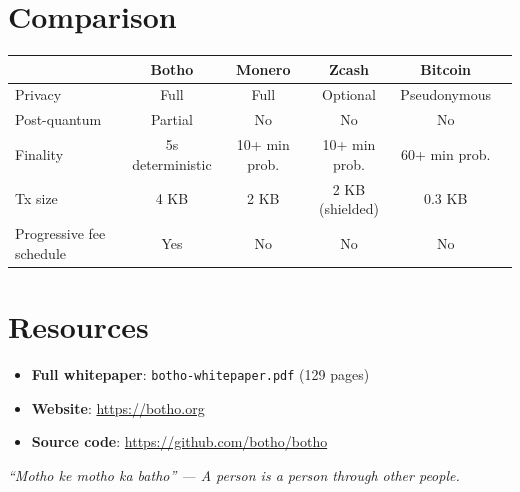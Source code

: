 \documentclass[11pt]{article}
\begin{document}
\section*{Comparison}

\begin{tabular}{@{}lccccc@{}}
\toprule
& \textbf{Botho} & \textbf{Monero} & \textbf{Zcash} & \textbf{Bitcoin} \\
\midrule
Privacy & Full & Full & Optional & Pseudonymous \\
Post-quantum & Partial & No & No & No \\
Finality & 5s deterministic & 10+ min prob. & 10+ min prob. & 60+ min prob. \\
Tx size & 4 KB & 2 KB & 2 KB (shielded) & 0.3 KB \\
Progressive fee schedule & Yes & No & No & No \\
\bottomrule
\end{tabular}

\section*{Resources}

\begin{itemize}
\item \textbf{Full whitepaper}: \texttt{botho-whitepaper.pdf} (129 pages)
\item \textbf{Website}: \url{https://botho.org}
\item \textbf{Source code}: \url{https://github.com/botho/botho}
\end{itemize}

\vfill
\begin{center}
\small\textit{``Motho ke motho ka batho'' --- A person is a person through other people.}
\end{center}
\end{document}
